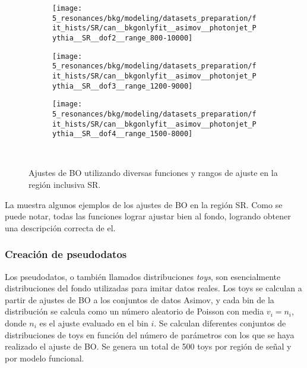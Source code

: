 \begin{figure}[ht!]
    \centering
    \begin{subfigure}[h]{0.32\linewidth}
        \centering
        \texttt{[image: 5\_resonances/bkg/modeling/datasets\_preparation/fit\_hists/SR/can\_\_bkgonlyfit\_\_asimov\_\_photonjet\_Pythia\_\_SR\_\_dof2\_\_range\_800-10000]}
    \end{subfigure}
    \hfill
    \begin{subfigure}[h]{0.32\linewidth}
        \centering
        \texttt{[image: 5\_resonances/bkg/modeling/datasets\_preparation/fit\_hists/SR/can\_\_bkgonlyfit\_\_asimov\_\_photonjet\_Pythia\_\_SR\_\_dof3\_\_range\_1200-9000]}
    \end{subfigure}
    \hfill
    \begin{subfigure}[h]{0.32\linewidth}
        \centering
        \texttt{[image: 5\_resonances/bkg/modeling/datasets\_preparation/fit\_hists/SR/can\_\_bkgonlyfit\_\_asimov\_\_photonjet\_Pythia\_\_SR\_\_dof4\_\_range\_1500-8000]}
    \end{subfigure}\\
    \caption{Ajustes de \ac{BO} utilizando diversas funciones y rangos de ajuste en la región inclusiva SR.}
    \label{fig:bkg:modeling:preparation:asimov_bkgonly:bkgonly_fits}
\end{figure}

La \Fig{\ref{fig:bkg:modeling:preparation:asimov_bkgonly:bkgonly_fits}} muestra algunos ejemplos de los ajustes de \ac{BO} en la región SR. Como se puede notar, todas las funciones lograr ajustar bien al fondo, logrando obtener una descripción correcta de el.








\subsubsection{Creación de pseudodatos}
\label{subsubsec:bkg:modeling:preparation:toys}

Los pseudodatos, o también llamados distribuciones \textit{toys}, son esencialmente distribuciones del fondo utilizadas para imitar datos reales. Los toys se calculan a partir de ajustes de \ac{BO} a los conjuntos de datos Asimov, y cada bin de la distribución se calcula como un número aleatorio de Poisson con media \(v_i = n_i\), donde \(n_i\) es el ajuste evaluado en el bin \(i\). Se calculan diferentes conjuntos de distribuciones de toys en función del número de parámetros con los que se haya realizado el ajuste de \ac{BO}. Se genera un total de 500 toys por región de señal y por modelo funcional.


